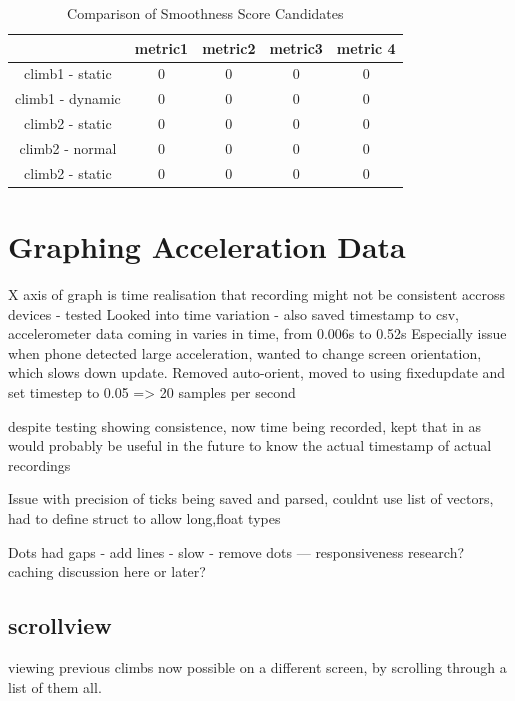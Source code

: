 \begin{table}[t]
\centering
\begin{tabular}{|c|c|c|c|c|}
\hline
                    & metric1   & metric2 & metric3   & metric 4    \\ \hline
climb1 - static     & 0         & 0       & 0         & 0           \\ \hline
climb1 - dynamic    & 0         & 0       & 0         & 0           \\ \hline
climb2 - static     & 0         & 0       & 0         & 0           \\ \hline
climb2 - normal     & 0         & 0       & 0         & 0           \\ \hline
climb2 - static     & 0         & 0       & 0         & 0           \\ \hline

\end{tabular}
\caption{Comparison of Smoothness Score Candidates}
\label{tab:smooth}
\end{table}


\section{Graphing Acceleration Data}
X axis of graph is time
realisation that recording might not be consistent accross devices - tested 
Looked into time variation - also saved timestamp to csv, accelerometer data coming in varies in time, from 0.006s to 0.52s 
Especially issue when phone detected large acceleration, wanted to change screen orientation, which slows down update.
Removed auto-orient,  moved to using fixedupdate and set timestep to 0.05 => 20 samples per second

despite testing showing consistence, now time being recorded, kept that in as would probably be useful in the future to know the actual timestamp of actual recordings



Issue with precision of ticks being saved and parsed, couldnt use list of vectors, had to define struct to allow long,float types


Dots had gaps - add lines - slow - remove dots ---  responsiveness research?
caching discussion here or later?


\subsection{scrollview}
viewing previous climbs now possible on a different screen, by scrolling through a list of them all.

